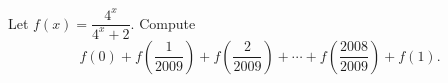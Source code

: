 Let $f(x)=\dfrac{4^x}{4^x+2}$. Compute
\[f(0)+f\left(\dfrac{1}{2009}\right)+f\left(\dfrac{2}{2009}\right)+\cdots+f\left(\dfrac{2008}{2009}\right)+f(1).\]
